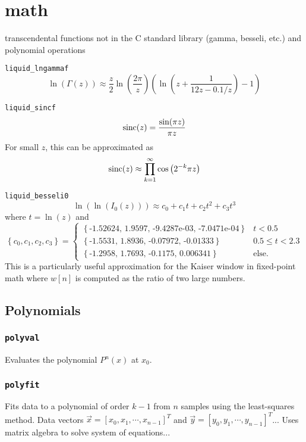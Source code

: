 % 
%

\section{math}
\label{module:math}
transcendental functions not in the C standard library (gamma, besseli, etc.)
and polynomial operations

{\tt liquid\_lngammaf}
\[
    \ln(\Gamma(z)) \approx
    \frac{z}{2} \ln\left( \frac{2\pi}{z} \right)
    \left(
        \ln\left(z + \frac{1}{12 z - 0.1/z} \right) - 1
    \right)
\]

{\tt liquid\_sincf}
\[ \textup{sinc}(z) = \frac{\sin(\pi z)}{\pi z} \]
For small $z$, this can be approximated as
\[
    \textup{sinc}(z) \approx \prod_{k=1}^{\infty}{ \cos\left( 2^{-k} \pi z \right) }
\]

{\tt liquid\_besseli0}
\[
    \ln\left(\ln\left(I_0(z)\right)\right) \approx
    c_0 + c_1 t + c_2 t ^2 + c_3 t^3
\]
where $t=\ln(z)$ and
\[
    \left\{c_0,c_1,c_2,c_3\right\} =
    \begin{cases}
    \left\{\text{-1.52624, 1.9597, -9.4287e-03, -7.0471e-04}\right\} & t < 0.5 \\
    \left\{\text{-1.5531, 1.8936, -0.07972, -0.01333}\right\} & 0.5 \le t < 2.3 \\
    \left\{\text{-1.2958, 1.7693, -0.1175, 0.006341}\right\} & \text{else}.
    \end{cases}
\]
This is a particularly useful approximation for the Kaiser window in
fixed-point math where $w[n]$ is computed as the ratio of two large numbers.

\subsection{Polynomials}

\subsubsection{{\tt polyval}}
Evaluates the polynomial $P^n(x)$ at $x_0$.

\subsubsection{{\tt polyfit}}
Fits data to a polynomial of order $k-1$ from $n$ samples using the
least-squares method.
Data vectors
$\vec{x}=[x_0,x_1,\cdots,x_{n-1}]^T$ and 
$\vec{y}=[y_0,y_1,\cdots,y_{n-1}]^T$...
Uses matrix algebra to solve system of equations...

